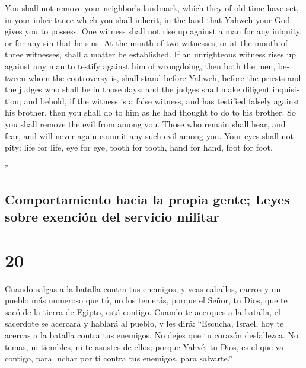 \begin{paracol}{2}
\begin{otherlanguage}{english}
 You shall not remove your neighbor's landmark, which
they of old time have set, in your inheritance which you shall inherit,
in the land that Yahweh your God gives you to possess. 
One witness shall not rise up against a man for any iniquity, or for any
sin that he sins. At the mouth of two witnesses, or at the mouth of
three witnesses, shall a matter be established.  If an
unrighteous witness rises up against any man to testify against him of
wrongdoing,  then both the men, between whom the
controversy is, shall stand before Yahweh, before the priests and the
judges who shall be in those days;  and the judges shall
make diligent inquisition; and behold, if the witness is a false
witness, and has testified falsely against his brother, 
then you shall do to him as he had thought to do to his brother. So you
shall remove the evil from among you.  Those who remain
shall hear, and fear, and will never again commit any such evil among
you.  Your eyes shall not pity: life for life, eye for
eye, tooth for tooth, hand for hand, foot for foot.

\end{otherlanguage}

\switchcolumn[0]*

\hypertarget{comportamiento-hacia-la-propia-gente-leyes-sobre-exenciuxf3n-del-servicio-militar}{%
\subsection{Comportamiento hacia la propia gente; Leyes sobre exención
del servicio
militar}\label{comportamiento-hacia-la-propia-gente-leyes-sobre-exenciuxf3n-del-servicio-militar}}

\hypertarget{section-38}{%
\section{20}\label{section-38}}

 Cuando salgas a la batalla contra tus enemigos, y veas
caballos, carros y un pueblo más numeroso que tú, no los temerás, porque
el Señor, tu Dios, que te sacó de la tierra de Egipto, está contigo.
 Cuando te acerques a la batalla, el sacerdote se acercará
y hablará al pueblo,  y les dirá: ``Escucha, Israel, hoy
te acercas a la batalla contra tus enemigos. No dejes que tu corazón
desfallezca. No temas, ni tiembles, ni te asustes de ellos;
 porque Yahvé, tu Dios, es el que va contigo, para luchar
por ti contra tus enemigos, para salvarte.''


\end{paracol}
